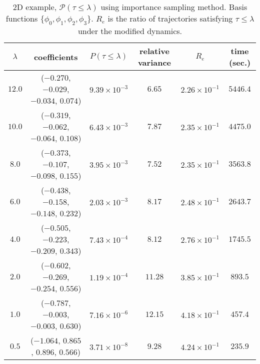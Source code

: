 \documentclass[final]{siamltex}
\begin{document}
\begin{table}
  \begin{tabular}{c|c|c|c|c|c}
    \hline
    $\lambda$ & coefficients & $P(\tau \le \lambda)$ & relative variance & $R_e$ & time (sec.) \\
    \hline
    $12.0$ & ($-0.270$, $-0.029$, $-0.034$, $0.074$) & $9.39 \times 10^{-3}$ & $6.65$ & $2.26\times 10^{-1}$ & $5446.4$ \\
    \hline
    $10.0$ & ($-0.319$, $-0.062$, $-0.064$, $0.108$) & $6.43\times 10^{-3}$ & $7.87$ & $2.35\times 10^{-1}$ & $4475.0$ \\
    \hline
    $8.0$ & ($-0.373$,  $-0.107$, $-0.098$, $0.155$) & $3.95\times 10^{-3}$ & $7.52$ & $2.35\times 10^{-1}$ & $3563.8$ \\
    \hline
    $6.0$ & ($-0.438$,  $-0.158$, $-0.148$, $0.232$) & $2.03\times 10^{-3}$ & $8.17$ & $2.48\times 10^{-1}$ & $2643.7$ \\
    \hline
    $4.0$ & ($-0.505$,  $-0.223$, $-0.209$, $0.343$) & $7.43\times 10^{-4}$ & $8.12$ & $2.76\times 10^{-1}$ & $1745.5$ \\
    \hline
    $2.0$ & ($-0.602$,  $-0.269$, $-0.254$, $0.556$) & $1.19\times 10^{-4}$ & $11.28$ & $3.85\times 10^{-1}$ & $893.5$ \\
    \hline
    $1.0$ & ($-0.787$,  $-0.003$, $-0.003$, $0.630$) & $7.16\times 10^{-6}$ & $12.15$ & $4.18\times 10^{-1}$ & $457.4$ \\
    \hline
    $0.5$ & ($-1.064$, $0.865$, $0.896$, $0.566$) & $3.71\times 10^{-8}$ & $9.28$ & $4.24\times 10^{-1}$ & $235.9$ \\
    \hline
  \end{tabular}
  \centering
  \caption{2D example, $\mathcal{P}(\tau \le \lambda)$ using importance sampling method. Basis functions $\{\phi_0, \phi_1, \phi_2, \phi_3\}$. $R_e$ is the ratio of trajectories satisfying $\tau \le \lambda$ under the modified dynamics. \label{tab-ex2-4}}
\end{table}
\end{document}
